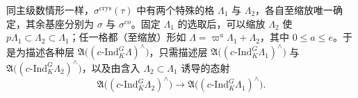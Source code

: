 同主级数情形一样，$\sigma^{\mathrm{crys}}(\tau)$ 中有两个特殊的格 $\Lambda_1$ 与 $\Lambda_2$，各自至缩放唯一确定，其余基座分别为 $\sigma$ 与 $\sigma^{co}$。固定 $\Lambda_1$ 的选取后，可以缩放 $\Lambda_2$ 使 $p\Lambda_1\subset\Lambda_2\subset\Lambda_1$；任一格都（至缩放）形如 $\Lambda=\varpi^a\Lambda_1+\Lambda_2$，其中 $0\le a\le e$。于是为描述各种层 $\mathfrak A\bigl((c\text{-Ind}_K^G\Lambda)^\wedge\bigr)$，只需描述层 $\mathfrak A\bigl((c\text{-Ind}_K^G\Lambda_1)^\wedge\bigr)$ 与 $\mathfrak A\bigl((c\text{-Ind}_K^G\Lambda_2)^\wedge\bigr)$，以及由含入 $\Lambda_2\subset\Lambda_1$ 诱导的态射
\begin{equation}\tag{7.4.7}\label{eq:a4-7-4-7}
\mathfrak A\bigl((c\text{-Ind}_K^G\Lambda_2)^\wedge\bigr)\to\mathfrak A\bigl((c\text{-Ind}_K^G\Lambda_1)^\wedge\bigr).
\end{equation}

